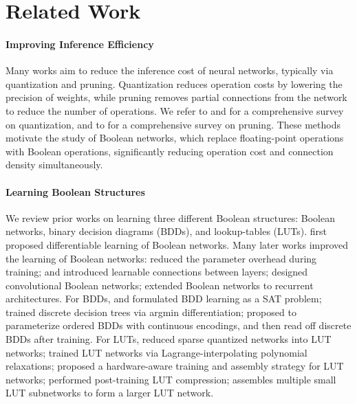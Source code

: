 \section{Related Work} \label{sec:related_work}

\paragraph{Improving Inference Efficiency} Many works aim to reduce the inference cost of neural networks, typically via quantization and pruning. Quantization reduces operation costs by lowering the precision of weights, while pruning removes partial connections from the network to reduce the number of operations. We refer to \citet{Gholami2021QuantSurvey} and \citet{liu2025low} for a comprehensive survey on quantization, and to \citet{cheng2024pruningsurvey} for a comprehensive survey on pruning. These methods motivate the study of Boolean networks, which replace floating-point operations with Boolean operations, significantly reducing operation cost and connection density simultaneously.

\paragraph{Learning Boolean Structures} We review prior works on learning three different Boolean structures: Boolean networks, binary decision diagrams (BDDs), and lookup-tables (LUTs). \citet{petersen2022deep} first proposed differentiable learning of Boolean networks. Many later works improved the learning of Boolean networks: \citet{ruttgers2025light} reduced the parameter overhead during training; \citet{bacellar2024differentiable} and \citet{fojcik2025lilogic} introduced learnable connections between layers; \citet{petersen2024convolutional} designed convolutional Boolean networks; \citet{buhrer2025recurrent} extended Boolean networks to recurrent architectures. For BDDs, \citet{Shati2023SATBDD} and \citet{Florio2023SATBDD} formulated BDD learning as a SAT problem; \citet{Zantedeschi2021ArgminTrees} trained discrete decision trees via argmin differentiation; \citet{Qiu2025OBDDNet} proposed to parameterize ordered BDDs with continuous encodings, and then read off discrete BDDs after training. For LUTs, \citet{Umuroglu2020LogicNetsFCCM} reduced sparse quantized networks into LUT networks; \citet{Wang2019LUTNet} trained LUT networks via Lagrange-interpolating polynomial relaxations; \citet{Andronic2025NeuraLUTAssembleFCCM} proposed a hardware-aware training and assembly strategy for LUT networks; \citet{Cassidy2025ReducedLUT} performed post-training LUT compression; \citet{Weng2025AmigoLUT} assembles multiple small LUT subnetworks to form a larger LUT network.
